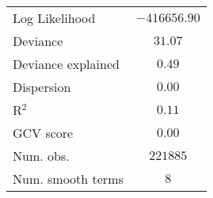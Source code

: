 \begin{longtable}{l c}
Log Likelihood                   & $-416656.90$   \\
Deviance                         & $31.07$        \\
Deviance explained               & $0.49$         \\
Dispersion                       & $0.00$         \\
R$^2$                            & $0.11$         \\
GCV score                        & $0.00$         \\
Num. obs.                        & $221885$       \\
Num. smooth terms                & $8$            \\
\end{longtable}
